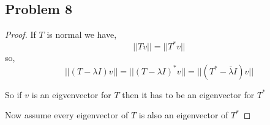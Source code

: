 \documentclass[a4paper]{report}
\begin{document}
\subsection*{Problem 8}
\begin{proof}
   If $T$ is normal we have, 
$$ ||Tv|| = ||T^*v|| $$ so, 
$$ ||(T - \lambda I)v || = ||(T - \lambda I)^*v || = ||(T^* - \overline{\lambda} I)v || $$ 

So if $v$ is an eigvenvector for $T$ then it has to be an eigenvector for $T^*$

Now assume every eigenvector of $T$ is also an eigenvector of $T^*$
\end{proof}
         
                  
\end{document}
